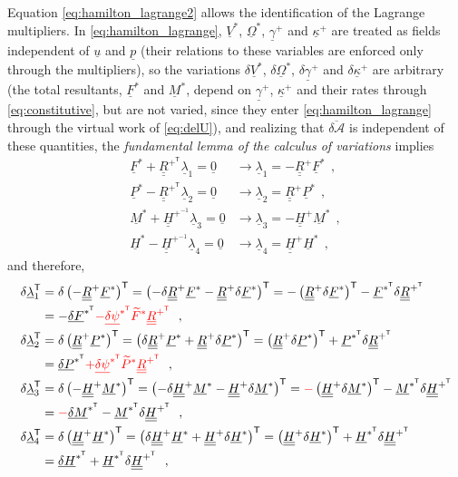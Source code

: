 \documentclass[12pt,a4paper,oneside,english]{abntex2} %
\newcommand{\fix}[1]{{\color{red}#1}}
\newcommand{\vect}[1]{\underline{#1}}
\def\tens#1{\underline{\underline{#1}}}
\def\til#1{\widetilde{#1}}
\def\lp{\left(}
\def\rp{\right)}
\def\T{\mathsf{T}}
\def\R{\tens{R}}
\def\Rp{\R^+}
\def\RpT{\R^{+^\T}}
\def\u{\vect{u}}
\def\gam{\vect{\gamma}}
\def\gamp{\gam^{+}}
\def\kap{\vect{\kappa}}
\def\kapp{\kap^{+}}
\def\V{\vect{V}}
\def\Vs{\V^{*}}
\def\Om{\vect{\Omega}}
\def\Oms{\Om^{*}}
\def\P{\vect{P}}
\def\Ps{\P^*}
\def\Ptils{\til{P}^{*}}
\def\PsT{\P^{*^\T}}
\def\Hv{\vect{H}}
\def\Hvs{\Hv^*}
\def\HvsT{\Hv^{*^\T}}
\def\H{\tens{H}}
\def\Hp{\H^{+}}
\def\HpT{\H^{+^\T}}
\def\Hpinv{\H^{+^{-1}}}
\def\p{\vect{p}}
\def\F{\vect{F}}
\def\Fs{\F^*}
\def\FsT{\F^{*^\T}}
\def\Ftils{\til{F}^*}
\def\M{\vect{M}}
\def\Ms{\M^*}
\def\MsT{\M^{*^\T}}
\def\delF{\vect{\delta F}}
\def\delM{\vect{\delta M}}
\def\delP{\vect{\delta P}}
\def\delH{\vect{\delta H}}
\def\delFsT{\delF^{*^\T}}
\def\delMsT{\delM^{*^\T}}
\def\delPsT{\delP^{*^\T}}
\def\delHsT{\delH^{*^\T}}
\def\delpsi{\vect{\delta\psi}}
\def\delpsisT{\delpsi^{*^\T}}
\def\lamb{\vect{\lambda}}
\def\zv{\vect{0}}
\def\deltaA{\overline{\delta\mathcal{A}}}
\begin{document}
Equation \eqref{eq:hamilton_lagrange2} allows the identification of the Lagrange multipliers. \fix{In \cref{eq:hamilton_lagrange}, $\Vs$, $\Oms$, $\gamp$ and $\kapp$ are treated as fields independent of $\u$ and $\p$ (their relations to these variables are enforced only through the multipliers), so} the variations $\delta\Vs$, $\delta\Oms$, $\delta\gamp$ and $\delta\kapp$ are arbitrary\fix{ (the total resultants, $\Fs$ and $\Ms$, depend on $\gamp$, $\kapp$ and their rates through \cref{eq:constitutive}, but are not varied, since they enter \cref{eq:hamilton_lagrange} through the virtual work of \cref{eq:delU})}, and realizing that $\deltaA$ is independent of these quantities, the \textit{fundamental lemma of the calculus of variations} \cite{reddy2002energy} implies
\begin{equation}
    \begin{aligned}
        \Fs+\RpT\lamb_1 = \zv &\rightarrow \lamb_1 = -\Rp\Fs \ \ ,
        \\
        \Ps-\RpT\lamb_2 = \zv &\rightarrow \lamb_2 = \Rp\Ps \ \ ,
        \\
        \Ms+\Hpinv\lamb_3 = \zv &\rightarrow \lamb_3 = -\Hp\Ms \ \ ,
        \\
        \Hvs-\Hpinv\lamb_4 = \zv &\rightarrow \lamb_4 = \Hp\Hvs \ \ ,
        \label{eq:lambdas} 
    \end{aligned}
\end{equation}
and therefore,
\begin{equation}
    \begin{aligned}
        \delta\lamb_1^\T &= \delta\lp-\Rp\Fs\rp^\T = \lp-\delta\Rp\Fs-\Rp\delta\Fs\rp^\T = -\lp\Rp\delta\Fs\rp^\T - \FsT\delta\RpT 
        \\
        &= -\delFsT \fix{- \delpsisT\Ftils\RpT} \ \ ,
        \\
        \delta\lamb_2^\T &= \delta\lp\Rp\Ps\rp^\T = \lp\delta\Rp\Ps+\Rp\delta\Ps\rp^\T = \lp\Rp\delta\Ps\rp^\T + \PsT\delta\RpT 
        \\
        &= \delPsT \fix{+ \delpsisT\Ptils\RpT} \ \ ,
        \\
        \delta\lamb_3^\T &= \delta\lp-\Hp\Ms\rp^\T = \lp-\delta\Hp\Ms-\Hp\delta\Ms\rp^\T = \fix{-}\lp\Hp\delta\Ms\rp^\T - \MsT\delta\HpT 
        \\
        &= \fix{-}\delMsT - \MsT\delta\HpT \ \ ,
        \\
        \delta\lamb_4^\T &= \delta\lp\Hp\Hvs\rp^\T = \lp\delta\Hp\Hvs+\Hp\delta\Hvs\rp^\T = \lp\Hp\delta\Hvs\rp^\T + \HvsT\delta\HpT
        \\
        &= \delHsT + \HvsT\delta\HpT \ \ ,
        \label{eq:lambdasT}
    \end{aligned}
\end{equation}
\end{document}
